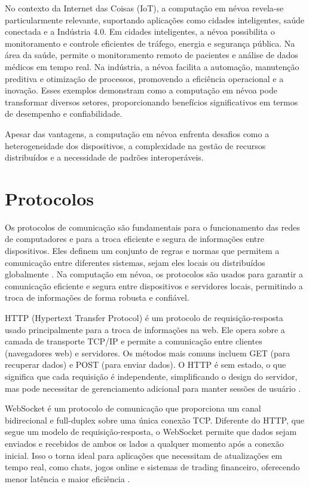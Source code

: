 No contexto da Internet das Coisas (IoT), a computação em névoa revela-se particularmente relevante, suportando aplicações como cidades inteligentes, saúde conectada e a Indústria 4.0. Em cidades inteligentes, a névoa possibilita o monitoramento e controle eficientes de tráfego, energia e segurança pública. Na área da saúde, permite o monitoramento remoto de pacientes e análise de dados médicos em tempo real. Na indústria, a névoa facilita a automação, manutenção preditiva e otimização de processos, promovendo a eficiência operacional e a inovação. Esses exemplos demonstram como a computação em névoa pode transformar diversos setores, proporcionando benefícios significativos em termos de desempenho e confiabilidade.

Apesar das vantagens, a computação em névoa enfrenta desafios como a heterogeneidade dos dispositivos, a complexidade na gestão de recursos distribuídos e a necessidade de padrões interoperáveis.

\section{Protocolos}

Os protocolos de comunicação são fundamentais para o funcionamento das redes de computadores e para a troca eficiente e segura de informações entre dispositivos. Eles definem um conjunto de regras e normas que permitem a comunicação entre diferentes sistemas, sejam eles locais ou distribuídos globalmente \cite{tanenbaum2011}. Na computação em névoa, os protocolos são usados para garantir a comunicação eficiente e segura entre dispositivos e servidores locais, permitindo a troca de informações de forma robusta e confiável.

HTTP (Hypertext Transfer Protocol) é um protocolo de requisição-resposta usado principalmente para a troca de informações na web. Ele opera sobre a camada de transporte TCP/IP e permite a comunicação entre clientes (navegadores web) e servidores. Os métodos mais comuns incluem GET (para recuperar dados) e POST (para enviar dados). O HTTP é sem estado, o que significa que cada requisição é independente, simplificando o design do servidor, mas pode necessitar de gerenciamento adicional para manter sessões de usuário \cite{gourley2002}.

WebSocket é um protocolo de comunicação que proporciona um canal bidirecional e full-duplex sobre uma única conexão TCP. Diferente do HTTP, que segue um modelo de requisição-resposta, o WebSocket permite que dados sejam enviados e recebidos de ambos os lados a qualquer momento após a conexão inicial. Isso o torna ideal para aplicações que necessitam de atualizações em tempo real, como chats, jogos online e sistemas de trading financeiro, oferecendo menor latência e maior eficiência \cite{wang2013}.

